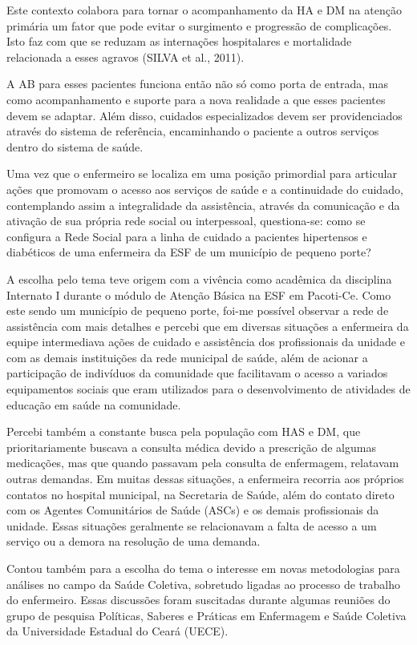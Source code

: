 Este contexto colabora para tornar o acompanhamento da HA e DM na atenção primária um fator que pode evitar o surgimento e progressão de complicações. Isto faz com que se reduzam as internações hospitalares e mortalidade relacionada a esses agravos (SILVA et al., 2011).

A AB para esses pacientes funciona então não só como porta de entrada, mas como acompanhamento e suporte para a nova realidade a que esses pacientes devem se adaptar. Além disso, cuidados especializados devem ser providenciados através do sistema de referência, encaminhando o paciente a outros serviços dentro do sistema de saúde. 

Uma vez que o enfermeiro se localiza em uma posição primordial para articular ações que promovam o acesso aos serviços de saúde e a continuidade do cuidado, contemplando assim a integralidade da assistência, através da comunicação e da ativação de sua própria rede social ou interpessoal, questiona-se: como se configura a Rede Social para a linha de cuidado a pacientes hipertensos e diabéticos de uma enfermeira da ESF de um município de pequeno porte?

A escolha pelo tema teve origem com a vivência como acadêmica da disciplina Internato I durante o módulo de Atenção Básica na ESF em Pacoti-Ce. Como este sendo um município de pequeno porte, foi-me possível observar a rede de assistência com mais detalhes e percebi que em diversas situações a enfermeira da equipe intermediava ações de cuidado e assistência dos profissionais da unidade e com as demais instituições da rede municipal de saúde, além de acionar a participação de indivíduos da comunidade que facilitavam o acesso a variados equipamentos sociais que eram utilizados para o desenvolvimento de atividades de educação em saúde na comunidade. 

Percebi também a constante busca pela população com HAS e DM, que prioritariamente buscava a consulta médica devido a prescrição de algumas medicações, mas que quando passavam pela consulta de enfermagem, relatavam outras demandas. Em muitas dessas situações, a enfermeira recorria aos próprios contatos no hospital municipal, na Secretaria de Saúde, além do contato direto com os Agentes Comunitários de Saúde (ASCs) e os demais profissionais da unidade. Essas situações geralmente se relacionavam a falta de acesso a um serviço ou a demora na resolução de uma demanda. 

Contou também para a escolha do tema o interesse em novas metodologias para análises no campo da Saúde Coletiva, sobretudo ligadas ao processo de trabalho do enfermeiro. Essas discussões foram suscitadas durante algumas reuniões do grupo de pesquisa Políticas, Saberes e Práticas em Enfermagem e Saúde Coletiva da Universidade Estadual do Ceará (UECE).  

